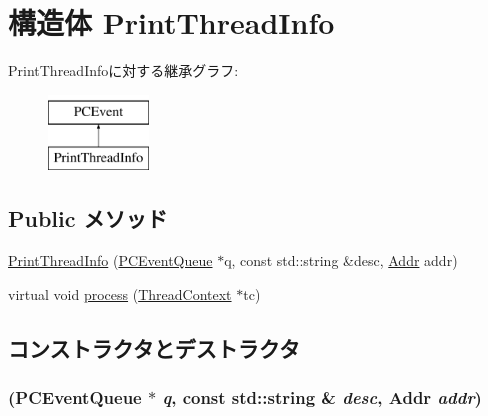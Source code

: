 \hypertarget{structLinuxAlphaSystem_1_1PrintThreadInfo}{
\section{構造体 PrintThreadInfo}
\label{structLinuxAlphaSystem_1_1PrintThreadInfo}
}
PrintThreadInfoに対する継承グラフ:\begin{figure}[H]
\begin{center}
\leavevmode
\includegraphics[height=2cm]{structLinuxAlphaSystem_1_1PrintThreadInfo}
\end{center}
\end{figure}
\subsection*{Public メソッド}
\begin{DoxyCompactItemize}
\item 
\hyperlink{structLinuxAlphaSystem_1_1PrintThreadInfo_a4359f2ff3627c3655ab7d570c74e8f2e}{PrintThreadInfo} (\hyperlink{classPCEventQueue}{PCEventQueue} $\ast$q, const std::string \&desc, \hyperlink{base_2types_8hh_af1bb03d6a4ee096394a6749f0a169232}{Addr} addr)
\item 
virtual void \hyperlink{structLinuxAlphaSystem_1_1PrintThreadInfo_ad66a9d5ec7cfe597b848a17c0df5cc28}{process} (\hyperlink{classThreadContext}{ThreadContext} $\ast$tc)
\end{DoxyCompactItemize}


\subsection{コンストラクタとデストラクタ}
\hypertarget{structLinuxAlphaSystem_1_1PrintThreadInfo_a4359f2ff3627c3655ab7d570c74e8f2e}{
\subsubsection[{PrintThreadInfo}]{ ({\bf PCEventQueue} $\ast$ {\em q}, \/  const std::string \& {\em desc}, \/  {\bf Addr} {\em addr})}}
\label{structLinuxAlphaSystem_1_1PrintThreadInfo_a4359f2ff3627c3655ab7d570c74e8f2e}



